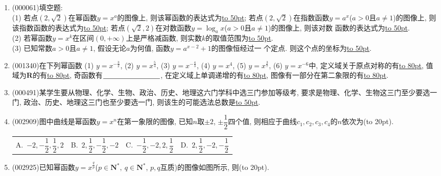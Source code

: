 \documentclass[10pt,a4paper]{article}
\newcommand{\blank}[1]{\underline{\hbox to #1pt{}}}
\newcommand{\bracket}[1]{(\hbox to #1pt{})}
\newcommand{\fourch}[4]{\par\begin{tabular}{p{.23\textwidth}p{.23\textwidth}p{.23\textwidth}p{.23\textwidth}}
A.~#1 &B.~#2& C.~#3& D.~#4
\end{tabular}}
\begin{document}
\begin{enumerate}[1.]

\item {\tiny (000061)}填空题:\\
(1) 若点$(2, \sqrt 2)$在幂函数$y=x^a$的图像上, 则该幂函数的表达式为\blank{50}; 若点$(2, \sqrt 2)$在指数函数$y=a^x$($a>0$且$a\ne 1$)的图像上, 则该指数函数的表达式为\blank{50}; 若点$(\sqrt 2, 2)$在对数函数$y=\log_a x$($a>0$且$a\ne 1$)的图像上, 则该对数
函数的表达式为\blank{50}.\\
(2) 若幂函数$y=x^k$在区间$(0, +\infty)$上是严格减函数, 则实数$k$的取值范围为\blank{50}.\\
(3) 已知常数$a>0$且$a\ne 1$, 假设无论$a$为何值, 函数$y=a^{x-2}+1$的图像恒经过一
个定点. 则这个点的坐标为\blank{50}.
\item {\tiny (001340)}在下列幂函数 (1) $y=x^{-\frac{3}{2}}$, (2) $y=x^{\frac{5}{4}}$, (3) $y=x^{-\frac{4}{3}}$, (4) $y=x^4$, (5) $y=x^{\frac{3}{7}}$, (6) $y=x^{-6}$中, 定义域关于原点对称的有\blank{80}, 值域为$\mathbf{R}$的有\blank{80}, 奇函数有$\blank{80}$, 在定义域上单调递增的有\blank{80}, 图像有一部分在第二象限的有\blank{80}.
\item {\tiny (000491)}某学生要从物理、化学、生物、政治、历史、地理这六门学科中选三门参加等级考, 要求是物理、化学、生物这三门至少要选一门, 政治、历史、地理这三门也至少要选一门, 则该生的可能选法总数是\blank{50}.
\item {\tiny (002909)}图中曲线是幂函数$y=x^n$在第一象限的图像, 已知$n$取$\pm 2$, $\pm\dfrac 12$四个值, 则相应于曲线$c_1,c_2,c_3,c_4$的$n$依次为\bracket{20}.
\begin{center}
    \end{center}
\fourch{$-2,-\dfrac 12,\dfrac 12,2$}{$2,\dfrac 12,-\dfrac 12,-2$
}{$-\dfrac 12,-2,2,\dfrac 12$}{$2,\dfrac 12,-2,-\dfrac 12$}
\item {\tiny (002925)}已知幂函数$y=x^{\frac qp}$($p\in \mathbf{N}^*,\ q\in \mathbf{N}^*$, $p,q$互质)的图像如图所示, 则\bracket{20}.

\end{enumerate}
\end{document}
